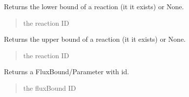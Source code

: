 \documentclass[letterpaper,12pt,english]{sphinxmanual}
\begin{document}
\begin{fulllineitems}
\begin{fulllineitems}
\begin{quote}
\begin{description}
\end{description}\end{quote}

\end{fulllineitems}


\begin{fulllineitems}
\label{\detokenize{api/core:cbmpy.CBModel.Model.getReactionLowerBound}}
\pysigstartsignatures
\pysiglinewithargsret
{}
{}
{}
\pysigstopsignatures
\sphinxAtStartPar
Returns the lower bound of a reaction (it it exists) or None.
\begin{quote}\begin{description}
\sphinxAtStartPar
{} \textendash{} the reaction ID

\end{description}\end{quote}

\end{fulllineitems}


\begin{fulllineitems}
\label{\detokenize{api/core:cbmpy.CBModel.Model.getReactionUpperBound}}
\pysigstartsignatures
\pysiglinewithargsret
{}
{}
{}
\pysigstopsignatures
\sphinxAtStartPar
Returns the upper bound of a reaction (it it exists) or None.
\begin{quote}\begin{description}
\sphinxAtStartPar
{} \textendash{} the reaction ID

\end{description}\end{quote}

\end{fulllineitems}


\begin{fulllineitems}
\label{\detokenize{api/core:cbmpy.CBModel.Model.getFluxBoundByID}}
\pysigstartsignatures
\pysiglinewithargsret
{}
{}
{}
\pysigstopsignatures
\sphinxAtStartPar
Returns a FluxBound/Parameter with id.
\begin{quote}\begin{description}
\sphinxAtStartPar
{} \textendash{} the fluxBound ID


\end{description}
\end{quote}
\end{fulllineitems}
\end{fulllineitems}
\end{document}
